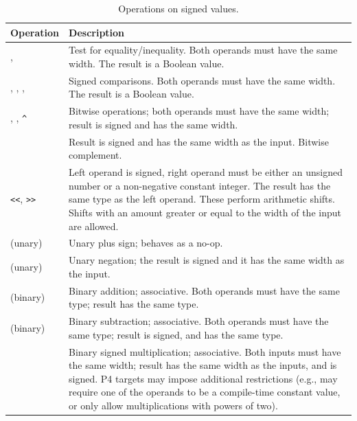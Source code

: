\documentclass[12pt]{article}
\begin{document}
\begin{table}[!h]
  \center
  \begin{tabular}{|lp{\descwidth}|} \hline
    \textbf{Operation} & \textbf{Description} \\ \hline
    \code{==}, \code{!=} & Test for equality/inequality.  Both
    operands must have the same width.  The result is a Boolean
    value. \\

    \code{<}, \code{>}, \code{<=}, \code{>=} & Signed comparisons.
    Both operands must have the same width.  The result is a Boolean
    value. \\
    
    \code{\&}, \code{|}, \verb|^| & Bitwise operations; both operands
    must have the same width; result is signed and has the same width. \\
    
    \code{\~{}} & Result is signed and has the same width as the
    input.  Bitwise complement. \\

    \verb|<<|, \verb|>>| & Left operand is signed, right operand must
    be either an unsigned number or a non-negative constant integer.
    The result has the same type as the left operand.  These perform
    arithmetic shifts.  Shifts with an amount greater or equal to the
    width of the input are allowed. \\

    \code{+} (unary) & Unary plus sign; behaves as a no-op. \\
    
    \code{-} (unary) & Unary negation; the result is signed and it
    has the same width as the input. \\

    \code{+} (binary) & Binary addition; associative.  Both operands
    must have the same type; result has the same type.  \\
    
    \code{-} (binary) & Binary subtraction; associative.  Both
    operands must have the same type; result is signed, and has
    the same type.  \\
    
    \code{*} & Binary signed multiplication; associative.  Both
    inputs must have the same width; result has the same width as
    the inputs, and is signed.  P4 targets may impose additional
    restrictions (e.g., may require one of the operands to be a
    compile-time constant value, or only allow multiplications with
    powers of two). \\
    
    \hline
  \end{tabular}
  \caption{Operations on signed values.\label{tab:signedoperations}}
\end{table}
\end{document}
